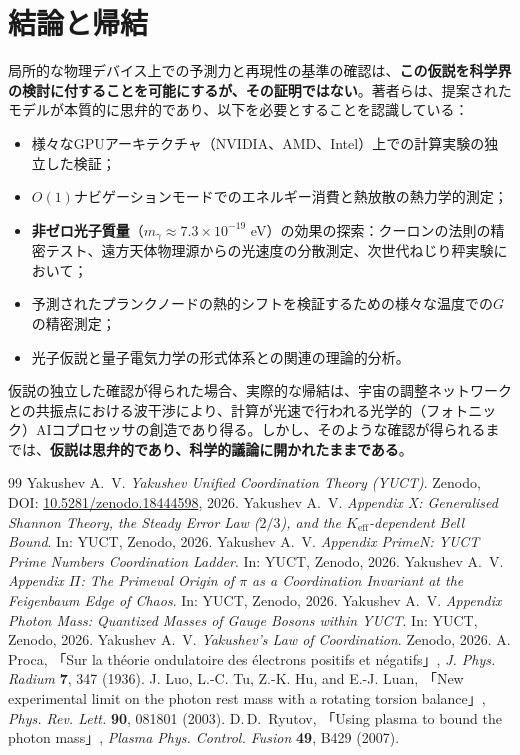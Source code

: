 \documentclass[11pt,a4paper]{article}
\begin{document}
	\section{結論と帰結}
	局所的な物理デバイス上での予測力と再現性の基準の確認は、\textbf{この仮説を科学界の検討に付することを可能にするが、その証明ではない}。著者らは、提案されたモデルが本質的に思弁的であり、以下を必要とすることを認識している：
	\begin{itemize}
		\item 様々なGPUアーキテクチャ（NVIDIA、AMD、Intel）上での計算実験の独立した検証；
		\item $O(1)$ナビゲーションモードでのエネルギー消費と熱放散の熱力学的測定；
		\item \textbf{非ゼロ光子質量}（$m_\gamma \approx 7.3 \times 10^{-19}$ eV）の効果の探索：クーロンの法則の精密テスト、遠方天体物理源からの光速度の分散測定、次世代ねじり秤実験において；
		\item 予測されたプランクノードの熱的シフトを検証するための様々な温度での$G$の精密測定；
		\item 光子仮説と量子電気力学の形式体系との関連の理論的分析。
	\end{itemize}
	
	仮説の独立した確認が得られた場合、実際的な帰結は、宇宙の調整ネットワークとの共振点における波干渉により、計算が光速で行われる光学的（フォトニック）AIコプロセッサの創造であり得る。しかし、そのような確認が得られるまでは、\textbf{仮説は思弁的であり、科学的議論に開かれたままである}。
	
	\begin{thebibliography}{99}
		Yakushev A.~V. \emph{Yakushev Unified Coordination Theory (YUCT)}. Zenodo, DOI: \href{https://doi.org/10.5281/zenodo.18444598}{10.5281/zenodo.18444598}, 2026.
		Yakushev A.~V. \emph{Appendix X: Generalised Shannon Theory, the Steady Error Law ($2/3$), and the $K_{\mathrm{eff}}$-dependent Bell Bound}. In: YUCT, Zenodo, 2026.
		Yakushev A.~V. \emph{Appendix PrimeN: YUCT Prime Numbers Coordination Ladder}. In: YUCT, Zenodo, 2026.
		Yakushev A.~V. \emph{Appendix $\Pi$: The Primeval Origin of $\pi$ as a Coordination Invariant at the Feigenbaum Edge of Chaos}. In: YUCT, Zenodo, 2026.
		Yakushev A.~V. \emph{Appendix Photon Mass: Quantized Masses of Gauge Bosons within YUCT}. In: YUCT, Zenodo, 2026.
		Yakushev A.~V. \emph{Yakushev's Law of Coordination}. Zenodo, 2026.
		A. Proca, 「Sur la théorie ondulatoire des électrons positifs et négatifs」, \emph{J. Phys. Radium} \textbf{7}, 347 (1936).
		J. Luo, L.-C. Tu, Z.-K. Hu, and E.-J. Luan, 「New experimental limit on the photon rest mass with a rotating torsion balance」, \emph{Phys. Rev. Lett.} \textbf{90}, 081801 (2003).
		D.\,D.\ Ryutov, 「Using plasma to bound the photon mass」, \emph{Plasma Phys. Control. Fusion} \textbf{49}, B429 (2007).
	\end{thebibliography}
	
\end{document}
